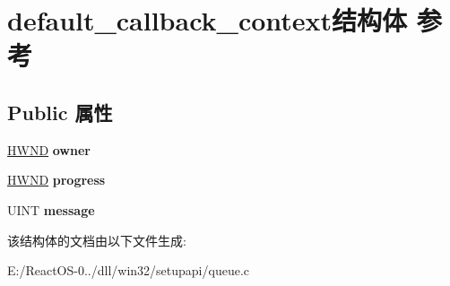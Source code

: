 \hypertarget{structdefault__callback__context}{}\section{default\+\_\+callback\+\_\+context结构体 参考}
\label{structdefault__callback__context}
\subsection*{Public 属性}
\begin{DoxyCompactItemize}
\item 
\mbox{\label{structdefault__callback__context_a7b29709effe5075af43cfe1294bc23dc}} 
\hyperlink{interfacevoid}{H\+W\+ND} {\bfseries owner}
\item 
\mbox{\label{structdefault__callback__context_a166a5c82e52b49e2e03eab258d823ef8}} 
\hyperlink{interfacevoid}{H\+W\+ND} {\bfseries progress}
\item 
\mbox{\label{structdefault__callback__context_a03197f07bfaefa368c2232b8d0e879ca}} 
U\+I\+NT {\bfseries message}
\end{DoxyCompactItemize}


该结构体的文档由以下文件生成\+:\begin{DoxyCompactItemize}
\item 
E\+:/\+React\+O\+S-\/0../dll/win32/setupapi/queue.\+c\end{DoxyCompactItemize}
